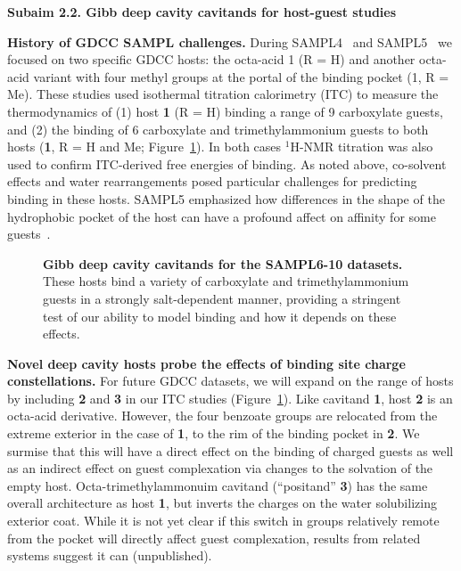 \documentclass[11pt]{article}
\begin{document}
\textbf{Subaim 2.2. Gibb deep cavity cavitands for host-guest studies} 


{\bf History of GDCC SAMPL challenges.} During SAMPL4~\cite{gibb_binding_2013} and SAMPL5~\cite{sullivan_binding_2016} we focused on two specific GDCC hosts: the octa-acid 1 (R = H) and another octa-acid variant with four methyl groups at the portal of the binding pocket (1, R = Me). 
These studies used isothermal titration calorimetry (ITC) to measure the thermodynamics of (1) host {\bf 1} (R = H) binding a range of 9 carboxylate guests,
and (2) the binding of 6 carboxylate and trimethylammonium guests to both hosts ({\bf 1}, R = H and Me; Figure~\ref{figure:gdccs}).  
In both cases $^1$H-NMR titration was also used to confirm ITC-derived free energies of binding.  
As noted above, co-solvent effects and water rearrangements posed particular challenges for predicting binding in these hosts. 
SAMPL5 emphasized how differences in the shape of the hydrophobic pocket of the host can have a profound affect on affinity for some guests~\cite{yin_overview_2016}.

\begin{figure}[h]
\begin{centering}

\end{centering}

\vspace{0.1in}
\caption{\footnotesize {\bf Gibb deep cavity cavitands for the SAMPL6-10 datasets.} These hosts bind a variety of carboxylate and trimethylammonium guests in a strongly salt-dependent manner, providing a stringent test of our ability to model binding and how it depends on these effects.
\label{figure:gdccs}}
\end{figure}

{\bf Novel deep cavity hosts probe the effects of binding site charge constellations.} 
For future GDCC datasets, we will expand on the range of hosts by including {\bf 2} and {\bf 3} in our ITC studies (Figure~\ref{figure:gdccs}).  
Like cavitand {\bf 1}, host {\bf 2} is an octa-acid derivative.  However, the four benzoate groups are relocated from the extreme exterior in the case of {\bf 1}, to the rim of the binding pocket in {\bf 2}.  
We surmise that this will have a direct effect on the binding of charged guests as well as an indirect effect on guest complexation via changes to the solvation of the empty host.  
Octa-trimethylammonuim cavitand (``positand'' {\bf 3}) has the same overall architecture as host {\bf 1}, but inverts the charges on the water solubilizing exterior coat.  
While it is not yet clear if this switch in groups relatively remote from the pocket will directly affect guest complexation, results from related systems suggest it can (unpublished). 
\end{document}
